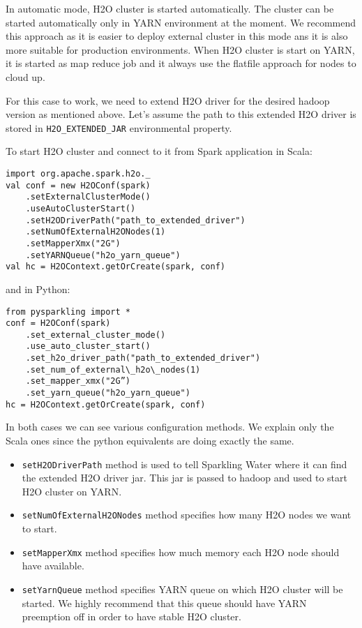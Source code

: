 In automatic mode, H2O cluster is started automatically. The cluster can be started automatically only in YARN environment at the moment. We recommend this approach as it is easier to deploy external cluster in this mode ans it is also more suitable for production environments. When H2O cluster is start on YARN, it is started as map reduce job and it always use the flatfile approach for nodes to cloud up.

For this case to work, we need to extend H2O driver for the desired hadoop version as mentioned above. Let's assume the path to this extended H2O driver is stored in \texttt{H2O\_EXTENDED\_JAR} environmental property.

To start H2O cluster and connect to it from Spark application in Scala:
\begin{lstlisting}[style=Scala]
import org.apache.spark.h2o._
val conf = new H2OConf(spark)
    .setExternalClusterMode()
    .useAutoClusterStart()
    .setH2ODriverPath("path_to_extended_driver")
    .setNumOfExternalH2ONodes(1)
    .setMapperXmx("2G")
    .setYARNQueue("h2o_yarn_queue")
val hc = H2OContext.getOrCreate(spark, conf)
\end{lstlisting}


and in Python:
\begin{lstlisting}[style=Python]
from pysparkling import *
conf = H2OConf(spark)
    .set_external_cluster_mode()
    .use_auto_cluster_start()
    .set_h2o_driver_path("path_to_extended_driver")
    .set_num_of_external\_h2o\_nodes(1)
    .set_mapper_xmx("2G”)
    .set_yarn_queue("h2o_yarn_queue")
hc = H2OContext.getOrCreate(spark, conf)
\end{lstlisting}


In both cases we can see various configuration methods. We explain only the Scala ones since the python equivalents are doing exactly the same.

\begin{itemize}
    \item \texttt{setH2ODriverPath} method is used to tell Sparkling Water where it can find the extended H2O driver jar. This jar is passed to hadoop and used to start H2O cluster on YARN.
    \item \texttt{setNumOfExternalH2ONodes} method specifies how many H2O nodes we want to start.
    \item \texttt{setMapperXmx} method specifies how much memory each H2O node should have available.
    \item \texttt{setYarnQueue} method specifies YARN queue on which H2O cluster will be started. We highly recommend that this queue should have YARN preemption off in order to have stable H2O cluster.
\end{itemize}

